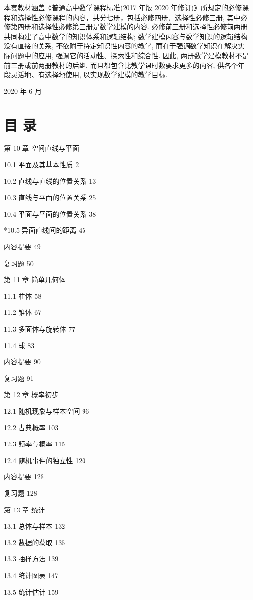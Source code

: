 \documentclass[10pt]{article}
\begin{document}
本套教材涵盖《普通高中数学课程标准(2017 年版 2020 年修订)》所规定的必修课程和选择性必修课程的内容，共分七册，包括必修四册、选择性必修三册, 其中必修第四册和选择性必修第三册是数学建模的内容. 必修前三册和选择性必修前两册共同构建了高中数学的知识体系和逻辑结构; 数学建模内容与数学知识的逻辑结构没有直接的关系, 不依附于特定知识性内容的教学, 而在于强调数学知识在解决实际问题中的应用, 强调它的活动性、探索性和综合性. 因此, 两册数学建模教材不是前三册或前两册教材的后继, 而且都包含比教学课时数要求更多的内容, 供各个年段灵活地、有选择地使用, 以实现数学建模的教学目标.

2020 年 6 月

\section*{目 录}

第 10 章 空间直线与平面

10.1 平面及其基本性质 2

10.2 直线与直线的位置关系 13

10.3 直线与平面的位置关系 25

10.4 平面与平面的位置关系 38

*10.5 异面直线间的距离 45

内容提要 49

复习题 50

第 11 章 简单几何体

11.1 柱体 58

11.2 锥体 67

11.3 多面体与旋转体 77

11.4 球 83

内容提要 90

复习题 91

第 12 章 概率初步

12.1 随机现象与样本空间 96

12.2 古典概率 103

12.3 频率与概率 115

12.4 随机事件的独立性 120

内容提要 128

复习题 128





第 13 章 统计

13.1 总体与样本 132

13.2 数据的获取 135

13.3 抽样方法 139

13.4 统计图表 147

13.5 统计估计 159
\end{document}
